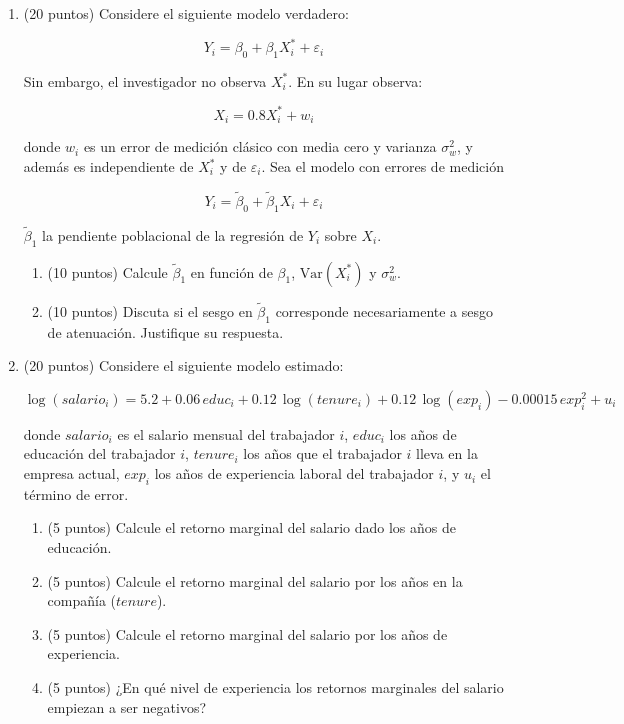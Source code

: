 \documentclass[10pt,a4paper]{article}
\begin{document}
\begin{enumerate}
    \item (20 puntos) Considere el siguiente modelo verdadero:

\[
Y_i = \beta_0 + \beta_1 X_i^* + \varepsilon_i
\]

Sin embargo, el investigador no observa \(X_i^*\). En su lugar observa:

\[
X_i = 0.8X_i^* + w_i
\]

donde \(w_i\) es un error de medición clásico con media cero y varianza \(\sigma_w^2\), y además es independiente de \(X_i^*\) y de \(\varepsilon_i\). Sea el modelo con errores de medición

\[
Y_i = \tilde\beta_0 + \tilde\beta_1 X_i + \varepsilon_i
\]


\(\tilde{\beta}_1\) la pendiente poblacional de la regresión de \(Y_i\) sobre \(X_i\). 

\begin{enumerate}
    \item (10 puntos) Calcule \(\tilde{\beta}_1\) en función de \(\beta_1\), \(\mathrm{Var}(X_i^*)\) y \(\sigma_w^2\).
    \item (10 puntos) Discuta si el sesgo en $\tilde\beta_1$ corresponde necesariamente a sesgo de atenuación. Justifique su respuesta.
\end{enumerate}



    \item (20 puntos) Considere el siguiente modelo estimado:

\[
\log(salario_i)= 5.2 + 0.06\,educ_i + 0.12\,\log(tenure_i) + 0.12\,\log(exp_i) - 0.00015\,exp_i^2 + u_i
\]

donde $salario_i$ es el salario mensual del trabajador $i$, $educ_i$ los años de educación del trabajador $i$, $tenure_i$ los años que el trabajador $i$ lleva en la empresa actual,  $exp_i$ los años de experiencia laboral del trabajador $i$, y $u_i$ el término de error.



\begin{enumerate}
    \item[a)] (5 puntos) Calcule el retorno marginal del salario dado los años de educación.
    \item[b)] (5 puntos) Calcule el retorno marginal del salario por los años en la compañía ($tenure$).
    \item[c)] (5 puntos) Calcule el retorno marginal del salario por los años de experiencia.
    \item[d)] (5 puntos) ¿En qué nivel de experiencia los retornos marginales del salario empiezan a ser negativos?
\end{enumerate}


\end{enumerate}
\end{document}
